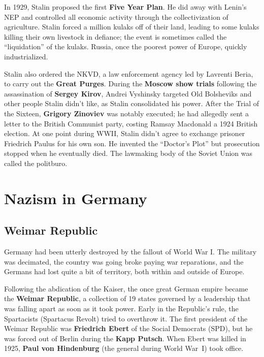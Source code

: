 In 1929, Stalin proposed the first \textbf{Five Year Plan}.
He did away with Lenin's NEP and controlled all economic activity through the collectivization of agriculture.
Stalin forced a million kulaks off of their land, leading to some kulaks killing their own livestock in defiance;
the event is sometimes called the ``liquidation'' of the kulaks.
Russia, once the poorest power of Europe, quickly industrialized.

Stalin also ordered the NKVD, a law enforcement agency led by Lavrenti Beria,
to carry out the \textbf{Great Purges}.
During the \textbf{Moscow show trials} following the assassination of \textbf{Sergey Kirov},
Andrei Vyshinsky targeted Old Bolsheviks and other people Stalin didn't like, as Stalin consolidated his power.
After the Trial of the Sixteen, \textbf{Grigory Zinoviev} was notably executed;
he had allegedly sent a letter to the British Communist party, costing Ramsay Macdonald a 1924 British election.
At one point during WWII, Stalin didn't agree to exchange prisoner Friedrich Paulus for his own son.
He invented the ``Doctor's Plot'' but prosecution stopped when he eventually died.
The lawmaking body of the Soviet Union was called the politburo.

\section{Nazism in Germany}

\subsection*{Weimar Republic}

Germany had been utterly destroyed by the fallout of World War I\@.
The military was decimated, the country was going broke paying war reparations,
and the Germans had lost quite a bit of territory, both within and outside of Europe.

Following the abdication of the Kaiser,
the once great German empire became the \textbf{Weimar Republic},
a collection of 19 states governed by a leadership that was falling apart as soon as it took power.
Early in the Republic's rule, the Spartacists (Spartacus Revolt) tried to overthrow it.
The first president of the Weimar Republic was \textbf{Friedrich Ebert} of the Social Democrats (SPD),
but he was forced out of Berlin during the \textbf{Kapp Putsch}.
When Ebert was killed in 1925, \textbf{Paul von Hindenburg} (the general during World War~I) took office.

